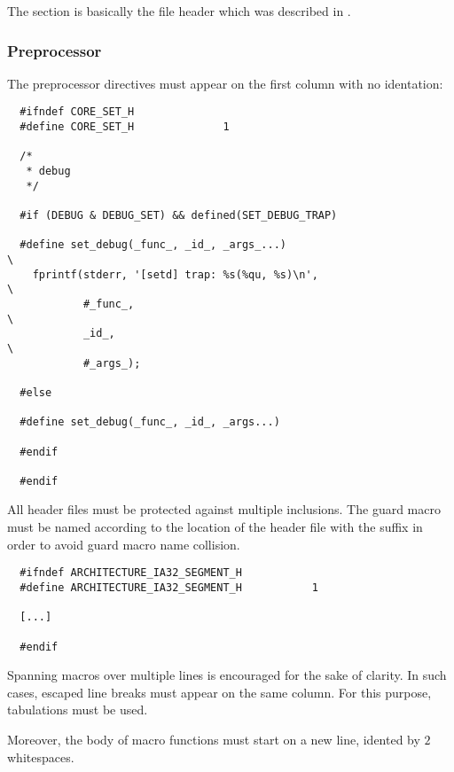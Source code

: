 The  section is basically the file header which was described
in .


\subsubsection{Preprocessor}

The preprocessor directives must appear on the first column with no
identation:

\begin{verbatim}
  #ifndef CORE_SET_H
  #define CORE_SET_H              1

  /*
   * debug
   */

  #if (DEBUG & DEBUG_SET) && defined(SET_DEBUG_TRAP)

  #define set_debug(_func_, _id_, _args_...)                              \
    fprintf(stderr, '[setd] trap: %s(%qu, %s)\n',                         \
            #_func_,                                                      \
            _id_,                                                         \
            #_args_);

  #else

  #define set_debug(_func_, _id_, _args...)

  #endif

  #endif
\end{verbatim}

All header files must be protected against multiple inclusions. The
guard macro must be named according to the location of the header file
with the suffix  in order to avoid guard macro name collision.

\begin{verbatim}
  #ifndef ARCHITECTURE_IA32_SEGMENT_H
  #define ARCHITECTURE_IA32_SEGMENT_H           1

  [...]

  #endif
\end{verbatim}

Spanning macros over multiple lines is encouraged for the sake of clarity. In
such cases, escaped line breaks  must appear
on the same column. For this purpose, tabulations must be used.

Moreover, the body of macro functions must start on a new line, idented by
$2$ whitespaces.

